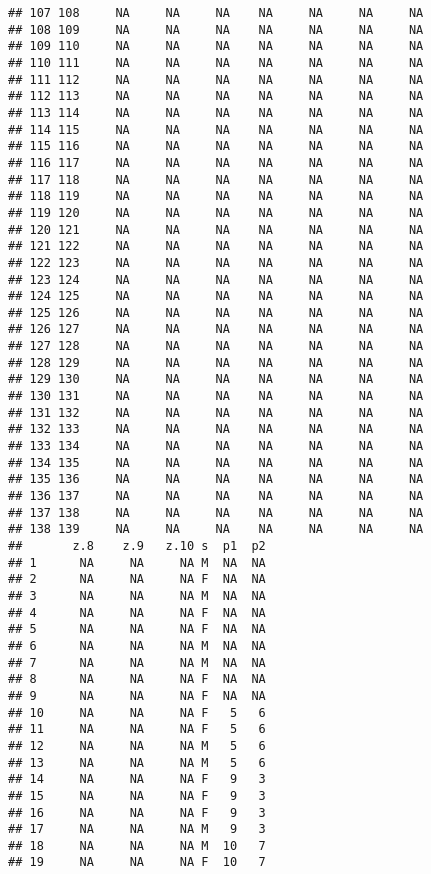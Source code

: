 \documentclass{article}\usepackage[]{graphicx}\usepackage[]{color}
\makeatletter
\newenvironment{kframe}{%
 \def\at@end@of@kframe{}%
 \ifinner\ifhmode%
  \def\at@end@of@kframe{\end{minipage}}%
  \begin{minipage}{\columnwidth}%
 \fi\fi%
 \def\FrameCommand##1{\hskip\@totalleftmargin \hskip-\fboxsep
 \colorbox{shadecolor}{##1}\hskip-\fboxsep
     \hskip-\linewidth \hskip-\@totalleftmargin \hskip\columnwidth}%
 \MakeFramed {\advance\hsize-\width
   \@totalleftmargin\z@ \linewidth\hsize
   \@setminipage}}%
 {\par\unskip\endMakeFramed%
 \at@end@of@kframe}
\newenvironment{knitrout}{}{} %
\makeatother
\begin{document}
\begin{knitrout}
\begin{kframe}
\begin{verbatim}
## 107 108     NA     NA     NA    NA     NA     NA     NA
## 108 109     NA     NA     NA    NA     NA     NA     NA
## 109 110     NA     NA     NA    NA     NA     NA     NA
## 110 111     NA     NA     NA    NA     NA     NA     NA
## 111 112     NA     NA     NA    NA     NA     NA     NA
## 112 113     NA     NA     NA    NA     NA     NA     NA
## 113 114     NA     NA     NA    NA     NA     NA     NA
## 114 115     NA     NA     NA    NA     NA     NA     NA
## 115 116     NA     NA     NA    NA     NA     NA     NA
## 116 117     NA     NA     NA    NA     NA     NA     NA
## 117 118     NA     NA     NA    NA     NA     NA     NA
## 118 119     NA     NA     NA    NA     NA     NA     NA
## 119 120     NA     NA     NA    NA     NA     NA     NA
## 120 121     NA     NA     NA    NA     NA     NA     NA
## 121 122     NA     NA     NA    NA     NA     NA     NA
## 122 123     NA     NA     NA    NA     NA     NA     NA
## 123 124     NA     NA     NA    NA     NA     NA     NA
## 124 125     NA     NA     NA    NA     NA     NA     NA
## 125 126     NA     NA     NA    NA     NA     NA     NA
## 126 127     NA     NA     NA    NA     NA     NA     NA
## 127 128     NA     NA     NA    NA     NA     NA     NA
## 128 129     NA     NA     NA    NA     NA     NA     NA
## 129 130     NA     NA     NA    NA     NA     NA     NA
## 130 131     NA     NA     NA    NA     NA     NA     NA
## 131 132     NA     NA     NA    NA     NA     NA     NA
## 132 133     NA     NA     NA    NA     NA     NA     NA
## 133 134     NA     NA     NA    NA     NA     NA     NA
## 134 135     NA     NA     NA    NA     NA     NA     NA
## 135 136     NA     NA     NA    NA     NA     NA     NA
## 136 137     NA     NA     NA    NA     NA     NA     NA
## 137 138     NA     NA     NA    NA     NA     NA     NA
## 138 139     NA     NA     NA    NA     NA     NA     NA
##       z.8    z.9   z.10 s  p1  p2
## 1      NA     NA     NA M  NA  NA
## 2      NA     NA     NA F  NA  NA
## 3      NA     NA     NA M  NA  NA
## 4      NA     NA     NA F  NA  NA
## 5      NA     NA     NA F  NA  NA
## 6      NA     NA     NA M  NA  NA
## 7      NA     NA     NA M  NA  NA
## 8      NA     NA     NA F  NA  NA
## 9      NA     NA     NA F  NA  NA
## 10     NA     NA     NA F   5   6
## 11     NA     NA     NA F   5   6
## 12     NA     NA     NA M   5   6
## 13     NA     NA     NA M   5   6
## 14     NA     NA     NA F   9   3
## 15     NA     NA     NA F   9   3
## 16     NA     NA     NA F   9   3
## 17     NA     NA     NA M   9   3
## 18     NA     NA     NA M  10   7
## 19     NA     NA     NA F  10   7

\end{verbatim}
\end{kframe}
\end{knitrout}
\end{document}
